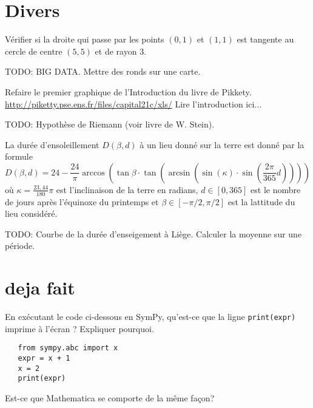 
\section*{Divers}

\begin{exercice}
    Vérifier si la droite qui passe par les points $(0,1)$ et $(1,1)$ est
    tangente au cercle de centre $(5,5)$ et de rayon $3$.
\end{exercice}

\begin{exercice}
    TODO: BIG DATA. Mettre des ronds sur une carte.
\end{exercice}

\begin{exercice}
Refaire le premier graphique de l'Introduction du livre de Pikkety.
\url{http://piketty.pse.ens.fr/files/capital21c/xls/}
Lire l'introduction ici...
\end{exercice}

\begin{exercice}
    TODO: Hypothèse de Riemann (voir livre de W. Stein).
\end{exercice}

\begin{exercice}
La durée d'ensoleillement $D(\beta, d)$ à un lieu donné sur la terre est donné par
la formule
\[
D(\beta,d) = 24 - \frac{24}{\pi}\arccos\left( \tan \beta \cdot
\tan\left(\arcsin\left(\sin(\kappa)\cdot \sin\left(\frac{2\pi}{365}d
\right)\right)\right)\right)
\]
où $\kappa=\frac{23,44}{180}\pi$ est l'inclinaison de la terre en radians,
$d\in[0,365]$ est le nombre de jours après l'équinoxe du printemps et
$\beta\in[-\pi/2,\pi/2]$ est la lattitude du lieu considéré.


    TODO: Courbe de la durée d'enseigement à Liège. Calculer la moyenne sur
    une période.
\end{exercice}

\section{deja fait}

\begin{exercice}
En exécutant le code ci-dessous en SymPy, qu'est-ce que la ligne
\texttt{print(expr)} imprime à l'écran ? Expliquer pourquoi.
\begin{verbatim}
   from sympy.abc import x
   expr = x + 1
   x = 2
   print(expr)
\end{verbatim}
Est-ce que Mathematica se comporte de la même façon?
\end{exercice}

